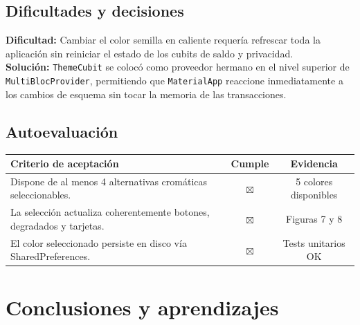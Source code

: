 \documentclass[12pt,a4paper]{article}
\begin{document}
\subsection{Dificultades y decisiones}
\textbf{Dificultad:} Cambiar el color semilla en caliente requería refrescar toda la aplicación sin reiniciar el estado de los cubits de saldo y privacidad.\\
\textbf{Solución:} \texttt{ThemeCubit} se colocó como proveedor hermano en el nivel superior de \texttt{MultiBlocProvider}, permitiendo que \texttt{MaterialApp} reaccione inmediatamente a los cambios de esquema sin tocar la memoria de las transacciones.

\subsection{Autoevaluación}
\begin{table}[h!]
\centering
\begin{tabular}{@{}lcc@{}}
\toprule
\textbf{Criterio de aceptación} & \textbf{Cumple} & \textbf{Evidencia} \\
\midrule
Dispone de al menos 4 alternativas cromáticas seleccionables. & $\boxtimes$ & 5 colores disponibles \\
La selección actualiza coherentemente botones, degradados y tarjetas. & $\boxtimes$ & Figuras 7 y 8 \\
El color seleccionado persiste en disco vía SharedPreferences. & $\boxtimes$ & Tests unitarios OK \\
\bottomrule
\end{tabular}
\end{table}

\section{Conclusiones y aprendizajes}
\end{document}
